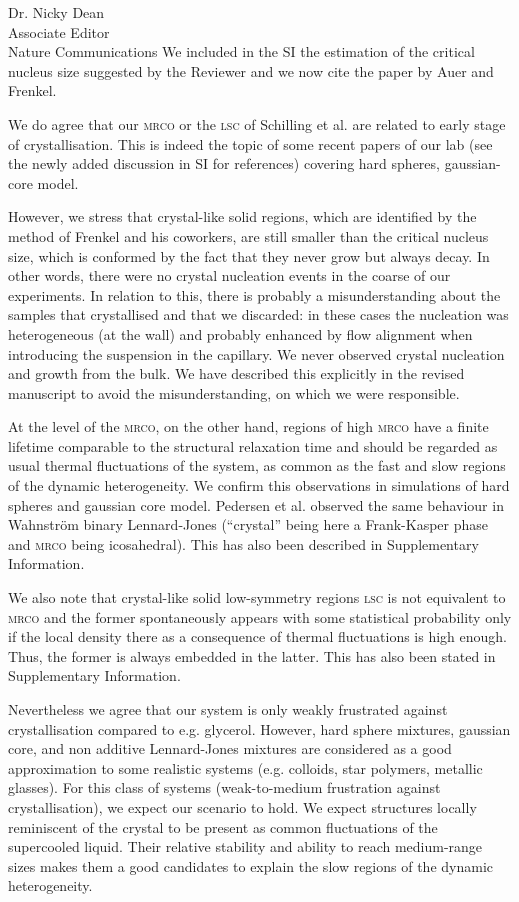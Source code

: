 \documentclass[a4paper, rebuttal, parskip=true, firsthead=false, fromemail=true, foldmarks=false]{scrlttr2}
\begin{document}
\begin{letter}{Dr. Nicky Dean\\
Associate Editor\\
Nature Communications}
We included in the SI the estimation of the critical nucleus size suggested by the Reviewer and we now cite the paper by Auer and Frenkel.

We do agree that our \textsc{mrco} or the \textsc{lsc} of Schilling et al. are related to early stage of crystallisation. This is indeed the topic of some recent papers of our lab (see the newly added discussion in SI for references) covering hard spheres, gaussian-core model. 

However, we stress that crystal-like solid regions, which are identified by the method of Frenkel and his coworkers, are still smaller than the critical nucleus size, 
which is conformed by the fact that they never grow but always decay. 
In other words, there were no crystal nucleation events in the coarse of our experiments. 
In relation to this, there is probably a misunderstanding about the samples that crystallised and that we discarded: in these cases the nucleation was heterogeneous (at the wall) and probably enhanced by flow alignment when introducing the suspension in the capillary. We never observed crystal nucleation and growth from the bulk. 
We have described this explicitly in the revised manuscript to avoid the misunderstanding, on which we were responsible. 

At the level of the \textsc{mrco}, on the other hand, regions of high \textsc{mrco} have a finite lifetime comparable to the structural relaxation time and should be regarded as  usual thermal fluctuations of the system, as common as the fast and slow regions of the dynamic heterogeneity. We confirm this observations in simulations of hard spheres and gaussian core model. Pedersen et al. observed the same behaviour in Wahnstr\"om binary Lennard-Jones (``crystal'' being here a Frank-Kasper phase and \textsc{mrco} being icosahedral). This has also been described in Supplementary Information. 

We also note that crystal-like solid low-symmetry regions \textsc{lsc} is not equivalent to \textsc{mrco} and the former spontaneously appears with some statistical probability only if the local density there as a consequence of thermal fluctuations is high enough. Thus, the former is always embedded in the latter. This has also been stated in Supplementary Information. 

Nevertheless we agree that our system is only weakly frustrated against crystallisation compared to e.g. glycerol. However, hard sphere mixtures, gaussian core, and non additive Lennard-Jones mixtures are considered as a good approximation to some realistic systems (e.g. colloids, star polymers, metallic glasses). For this class of systems (weak-to-medium frustration against crystallisation), we expect our scenario to hold. We expect structures locally reminiscent of the crystal to be present as common fluctuations of the supercooled liquid. Their relative stability and ability to reach medium-range sizes makes them a good candidates to explain the slow regions of the dynamic heterogeneity.


\end{letter}
\end{document}

